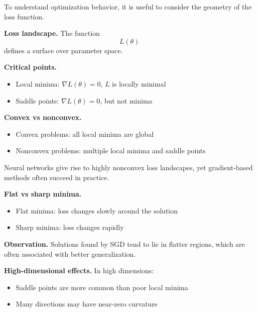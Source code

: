 To understand optimization behavior, it is useful to consider the geometry of the loss function.

\medskip

\noindent
\textbf{Loss landscape.}  
The function
\[
L(\theta)
\]
defines a surface over parameter space.

\medskip

\noindent
\textbf{Critical points.}
\begin{itemize}
    \item Local minima: $\nabla L(\theta) = 0$, $L$ is locally minimal
    \item Saddle points: $\nabla L(\theta) = 0$, but not minima
\end{itemize}

\medskip

\noindent
\textbf{Convex vs nonconvex.}
\begin{itemize}
    \item Convex problems: all local minima are global
    \item Nonconvex problems: multiple local minima and saddle points
\end{itemize}

\medskip

Neural networks give rise to highly nonconvex loss landscapes, yet gradient-based methods often succeed in practice.

\medskip

\noindent
\textbf{Flat vs sharp minima.}
\begin{itemize}
    \item Flat minima: loss changes slowly around the solution
    \item Sharp minima: loss changes rapidly
\end{itemize}

\medskip

\noindent
\textbf{Observation.}  
Solutions found by SGD tend to lie in flatter regions, which are often associated with better generalization.

\medskip

\noindent
\textbf{High-dimensional effects.}  
In high dimensions:
\begin{itemize}
    \item Saddle points are more common than poor local minima
    \item Many directions may have near-zero curvature
\end{itemize}

\medskip

